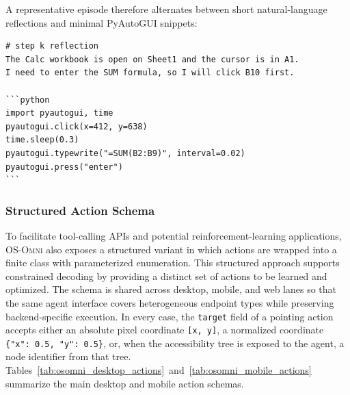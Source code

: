 A representative episode therefore alternates between short natural-language reflections and minimal PyAutoGUI snippets:

\small
\begin{Verbatim}[fontsize=\small]
# step k reflection
The Calc workbook is open on Sheet1 and the cursor is in A1.
I need to enter the SUM formula, so I will click B10 first.

```python
import pyautogui, time
pyautogui.click(x=412, y=638)
time.sleep(0.3)
pyautogui.typewrite("=SUM(B2:B9)", interval=0.02)
pyautogui.press("enter")
```
\end{Verbatim}
\normalsize

\subsubsection{Structured Action Schema}
\label{app:osomni_action_schema}

To facilitate tool-calling APIs and potential reinforcement-learning applications, \textsc{OS-Omni} also exposes a structured variant in which actions are wrapped into a finite class with parameterized enumeration. This structured approach supports constrained decoding by providing a distinct set of actions to be learned and optimized. The schema is shared across desktop, mobile, and web lanes so that the same agent interface covers heterogeneous endpoint types while preserving backend-specific execution. In every case, the \texttt{target} field of a pointing action accepts either an absolute pixel coordinate \texttt{[x,~y]}, a normalized coordinate \texttt{\{"x":~0.5,~"y":~0.5\}}, or, when the accessibility tree is exposed to the agent, a node identifier from that tree. Tables~\ref{tab:osomni_desktop_actions}~and~\ref{tab:osomni_mobile_actions} summarize the main desktop and mobile action schemas.

